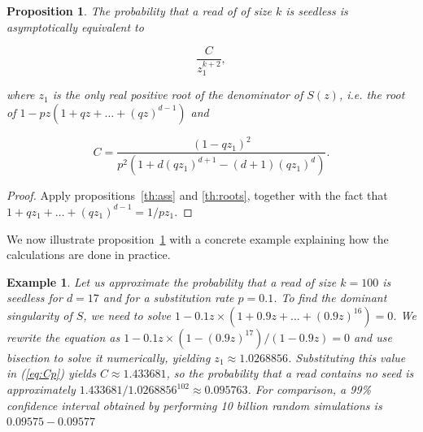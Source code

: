 \documentclass{article}
\newtheorem{example}{Example}
\newtheorem{proposition}{Proposition}
\begin{document}
\begin{proposition}
\label{th:p}
The probability that a read of of size $k$ is seedless is
asymptotically equivalent to

\begin{equation*}
\frac{C}{z_1^{k+2}},
\end{equation*}

\noindent
where $z_1$ is the only real positive root of the denominator of $S(z)$,
\textit{i.e.} the root of $1-pz(1+qz+\ldots+(qz)^{d-1})$ and

\begin{equation}
\label{eq:Cp}
C =\frac{(1-qz_1)^2}{p^2\left( 1 + d(qz_1)^{d+1} - (d+1)(qz_1)^d
\right)}.
\end{equation}

\end{proposition}

\begin{proof}
Apply propositions~\ref{th:ass} and \ref{th:roots}, together with the fact
that $1+qz_1+\ldots+(qz_1)^{d-1} = 1/pz_1$.
\end{proof}

We now illustrate proposition~\ref{th:p} with a concrete example
explaining how the calculations are done in practice.

\begin{example}
\label{ex:num1}
Let us approximate the probability that a read of size $k=100$ is seedless
for $d=17$ and for a substitution rate $p=0.1$. To find the dominant
singularity of $S$, we need to solve
$1-0.1z\times(1+0.9z+\ldots+(0.9z)^{16}) = 0$.  We rewrite the equation as
$1 - 0.1z\times(1-(0.9 z)^{17})/(1-0.9z) = 0$ and use bisection to solve
it numerically, yielding $z_1 \approx 1.0268856$. Substituting this value
in (\ref{eq:Cp}) yields $C \approx 1.433681$, so the probability that a
read contains no seed is approximately $1.433681 / 1.0268856^{102} \approx
0.095763$. For comparison, a 99\% confidence interval obtained by
performing 10 billion random simulations is $0.09575-0.09577$
\end{example}
\end{document}
